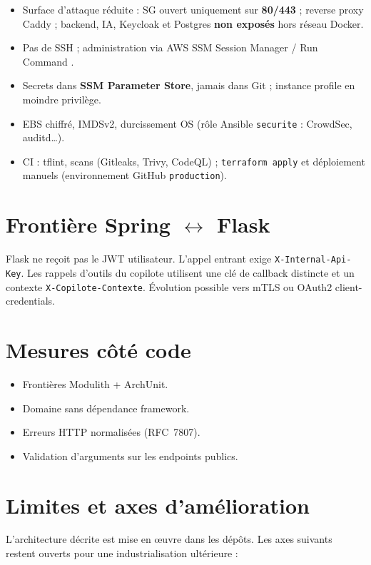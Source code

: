 \begin{itemize}[leftmargin=*]
  \item Surface d'attaque réduite : SG ouvert uniquement sur \textbf{80/443} ; reverse proxy Caddy ;
        backend, IA, Keycloak et Postgres \textbf{non exposés} hors réseau Docker.
  \item Pas de SSH ; administration via AWS SSM Session Manager / Run Command \cite{awsssm}.
  \item Secrets dans \textbf{SSM Parameter Store}, jamais dans Git ; instance profile en moindre privilège.
  \item EBS chiffré, IMDSv2, durcissement OS (rôle Ansible \texttt{securite} : CrowdSec, auditd\ldots).
  \item CI : tflint, scans (Gitleaks, Trivy, CodeQL) ; \texttt{terraform apply} et déploiement manuels
        (environnement GitHub \texttt{production}).
\end{itemize}

\section{Frontière Spring $\leftrightarrow$ Flask}

Flask ne reçoit pas le JWT utilisateur. L'appel entrant exige \texttt{X-Internal-Api-Key}.
Les rappels d'outils du copilote utilisent une clé de callback distincte et un contexte
\texttt{X-Copilote-Contexte}. Évolution possible vers mTLS ou OAuth2 client-credentials.

\section{Mesures côté code}

\begin{itemize}[leftmargin=*]
  \item Frontières Modulith + ArchUnit.
  \item Domaine sans dépendance framework.
  \item Erreurs HTTP normalisées (RFC~7807).
  \item Validation d'arguments sur les endpoints publics.
\end{itemize}

\section{Limites et axes d'amélioration}

L'architecture décrite est mise en œuvre dans les dépôts. Les axes suivants restent ouverts
pour une industrialisation ultérieure :

